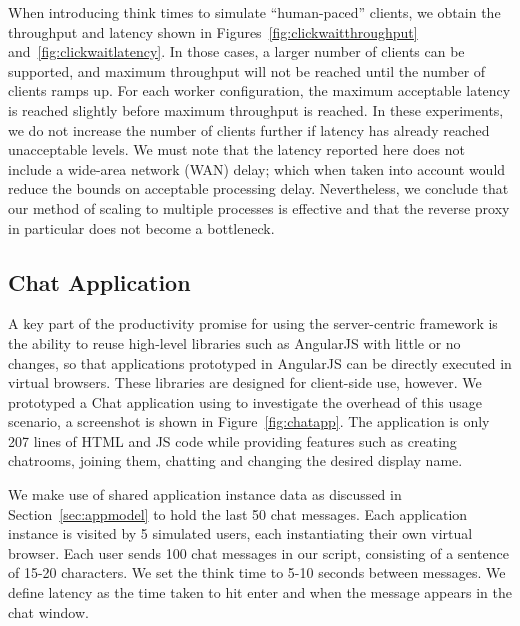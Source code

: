 When introducing think times to simulate ``human-paced'' clients, we obtain the
throughput and latency shown in Figures~\ref{fig:clickwaitthroughput} 
and~\ref{fig:clickwaitlatency}.  In those cases, a larger number of clients can be
supported, and maximum throughput will not be reached until the number of
clients ramps up.  For each worker configuration, the maximum acceptable latency 
is reached slightly before maximum throughput is reached.  In these experiments,
we do not increase the number of clients further if latency has already reached
unacceptable levels.
We must note that the latency reported here does not include a wide-area network (WAN) delay;
which when taken into account would reduce the bounds on acceptable processing delay.
Nevertheless, we conclude that our method of scaling to multiple processes is effective 
and that the reverse proxy in particular does not become a bottleneck.

\subsection{Chat Application} 

A key part of the productivity promise for using the server-centric \cb framework
is the ability to reuse high-level libraries such as AngularJS with little or
no changes, so that applications prototyped in AngularJS can be directly
executed in virtual browsers.  These libraries are designed for client-side
use, however.  We prototyped a Chat application using to investigate the overhead
of this usage scenario, a screenshot is shown in Figure~\ref{fig:chatapp}.  
The application is only 207 lines of HTML and JS code while providing features such as 
creating chatrooms, joining them, chatting and changing the desired display name.

\chatroomfig{}

We make use of shared application instance data as discussed in Section~\ref{sec:appmodel}
to hold the last 50 chat messages.  Each application instance is visited by 5 simulated users,
each instantiating their own virtual browser.  Each user sends 100 chat messages in our
script, consisting of a sentence of 15-20 characters.  We set the think time to 5-10 seconds
between messages.  We define latency as the time taken to hit enter and when the  message
appears in the chat window.

\angularchatlatency{}

